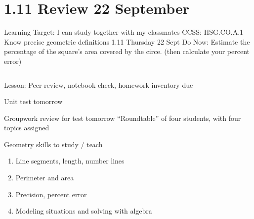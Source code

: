 \section{1.11 Review \hfill 22 September}
\begin{frame}{Learning Target: I can study together with my classmates}
    {CCSS: HSG.CO.A.1 Know precise geometric definitions \hfill \alert{1.11 Thursday 22 Sept}}
        Do Now: Estimate the percentage of the square's area covered by the circe. (then calculate your percent error) \bigskip
        \begin{columns}
        \end{columns} \bigskip
        Lesson: Peer review, notebook check, homework inventory due \par \smallskip
        \alert{Unit test tomorrow}
    \end{frame} 

\begin{frame}{Groupwork review for \alert{test tomorrow}}
    {``Roundtable'' of four students, with four topics assigned}
    \begin{block}{Geometry skills to study / teach}
        \begin{enumerate}
        \item Line segments, length, number lines
        \item Perimeter and area
        \item Precision, percent error
        \item Modeling situations and solving with algebra
    \end{enumerate}
    \end{block}
    \end{frame}
    

